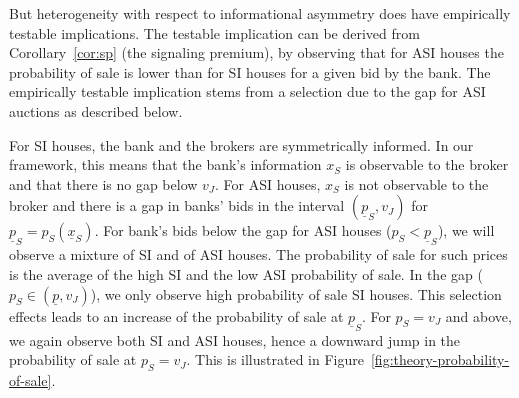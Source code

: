 \documentclass[11pt,twopage]{article}
\newcommand{\ul}{\underline}
\begin{document}
But heterogeneity with respect to informational asymmetry does have
empirically testable implications. 
The testable implication can be derived from Corollary~\ref{cor:sp} (the signaling premium), by observing that for ASI houses the probability of sale is lower than for SI houses for a given bid by the bank. The empirically testable implication stems from a selection due to the gap for ASI auctions as described below.

For SI houses, the bank and the brokers are symmetrically informed. In our framework, this means that the bank's information $x_S$ is observable to the broker and that there is no gap below $v_J$. For ASI houses,  $x_S$ is not observable to the broker and there is a gap in banks' bids in the interval $(\ul p_S,v_J)$ for $\ul p_S=p_S(\ul x_S)$. For bank's bids below the gap for ASI houses ($p_S<\ul p_S$), we will observe a mixture of SI and of ASI houses. The probability of sale for such prices is the
average of the high SI and the low ASI probability of sale. In the gap ($p_S\in(\ul p,v_J)$), we only observe high probability of sale SI houses. This selection effects leads to an increase of the probability of sale at $\ul p_S$. For $p_S=v_J$ and above, we again observe both SI and ASI
houses, hence a downward jump in the probability of sale at
$p_S=v_J$.
%
This is illustrated in
Figure~\ref{fig:theory-probability-of-sale}.  
\end{document}
